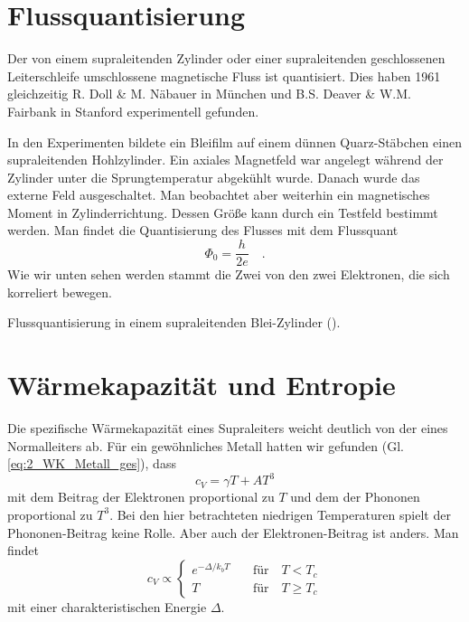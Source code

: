 \section{Flussquantisierung}

Der von einem supraleitenden Zylinder oder einer supraleitenden geschlossenen Leiterschleife umschlossene magnetische Fluss ist quantisiert. Dies haben 1961 gleichzeitig R. Doll \& M. Näbauer in München und B.S. Deaver \& W.M. Fairbank in Stanford experimentell gefunden.

In den Experimenten bildete ein Bleifilm auf einem dünnen Quarz-Stäbchen einen  supraleitenden Hohlzylinder. Ein axiales Magnetfeld war angelegt während der Zylinder unter die Sprungtemperatur abgekühlt wurde. Danach wurde das externe Feld ausgeschaltet. Man beobachtet aber weiterhin ein magnetisches Moment in Zylinderrichtung. Dessen Größe kann durch ein Testfeld bestimmt werden. Man findet die Quantisierung des Flusses mit dem Flussquant
\begin{equation}
    \Phi_0 = \frac{h}{2 e} \quad .
\end{equation}
Wie wir unten sehen werden stammt die Zwei von den zwei Elektronen, die sich korreliert bewegen.

\begin{marginfigure}
    \caption{Flussquantisierung in einem supraleitenden Blei-Zylinder (\cite{Doll1961}).}
\end{marginfigure}


\section*{Wärmekapazität und Entropie}

Die spezifische Wärmekapazität eines Supraleiters weicht deutlich von der eines Normalleiters ab. Für ein gewöhnliches Metall hatten wir gefunden (Gl. \ref{eq:2_WK_Metall_ges}), dass  
\begin{equation}
    c_V = \gamma T + A T^3
\end{equation}
mit dem Beitrag der Elektronen proportional zu $T$ und dem der Phononen proportional zu $T^3$. Bei den hier betrachteten niedrigen Temperaturen spielt der Phononen-Beitrag keine Rolle. Aber auch der Elektronen-Beitrag ist anders. Man findet
\begin{equation}
    c_V \propto 
    \left\{
   \begin{matrix}
    e^{- \Delta / k_b T} \quad & \text{für} \quad T < T_c \\
    T  & \text{für} \quad T \ge T_c 
   \end{matrix}
    \right.
\end{equation}
mit einer charakteristischen  Energie $\Delta$.


